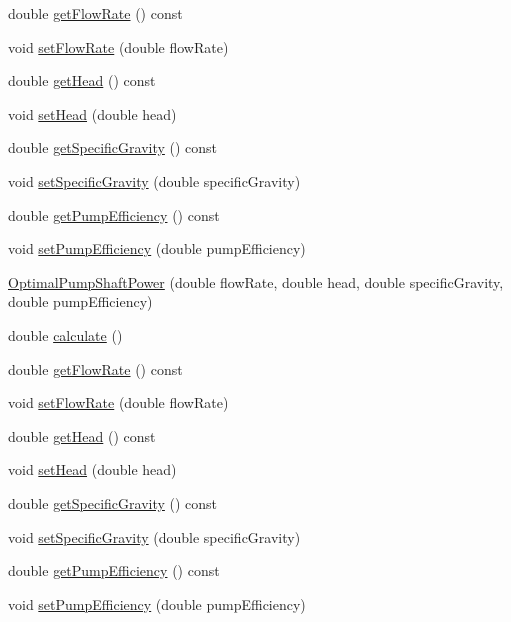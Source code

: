\begin{DoxyCompactItemize}
\item 
double \hyperlink{class_optimal_pump_shaft_power_a8c1532459a196347f7d5219d4690a490}{get\+Flow\+Rate} () const
\item 
void \hyperlink{class_optimal_pump_shaft_power_a38efdee39db4c3856915f1ab26d44ed2}{set\+Flow\+Rate} (double flow\+Rate)
\item 
double \hyperlink{class_optimal_pump_shaft_power_abb285a8a256c10187113c34db1a4462b}{get\+Head} () const
\item 
void \hyperlink{class_optimal_pump_shaft_power_aa080c62ff92fc70a4e27e7710e490b62}{set\+Head} (double head)
\item 
double \hyperlink{class_optimal_pump_shaft_power_a607d32c56edece639e03007adc1bf325}{get\+Specific\+Gravity} () const
\item 
void \hyperlink{class_optimal_pump_shaft_power_aa565a332e4b144c8eb85fd06c541199e}{set\+Specific\+Gravity} (double specific\+Gravity)
\item 
double \hyperlink{class_optimal_pump_shaft_power_a77b9c639438f9d6008c20948f173a2c4}{get\+Pump\+Efficiency} () const
\item 
void \hyperlink{class_optimal_pump_shaft_power_a2cb2c6b537c7db0bc5071f09c66308d0}{set\+Pump\+Efficiency} (double pump\+Efficiency)
\item 
\hyperlink{class_optimal_pump_shaft_power_a6970e2672e4ef7c124a876eda96ee3cc}{Optimal\+Pump\+Shaft\+Power} (double flow\+Rate, double head, double specific\+Gravity, double pump\+Efficiency)
\item 
double \hyperlink{class_optimal_pump_shaft_power_a23ab040eea0a9e0431988bd353076237}{calculate} ()
\item 
double \hyperlink{class_optimal_pump_shaft_power_a8c1532459a196347f7d5219d4690a490}{get\+Flow\+Rate} () const
\item 
void \hyperlink{class_optimal_pump_shaft_power_a38efdee39db4c3856915f1ab26d44ed2}{set\+Flow\+Rate} (double flow\+Rate)
\item 
double \hyperlink{class_optimal_pump_shaft_power_abb285a8a256c10187113c34db1a4462b}{get\+Head} () const
\item 
void \hyperlink{class_optimal_pump_shaft_power_aa080c62ff92fc70a4e27e7710e490b62}{set\+Head} (double head)
\item 
double \hyperlink{class_optimal_pump_shaft_power_a607d32c56edece639e03007adc1bf325}{get\+Specific\+Gravity} () const
\item 
void \hyperlink{class_optimal_pump_shaft_power_aa565a332e4b144c8eb85fd06c541199e}{set\+Specific\+Gravity} (double specific\+Gravity)
\item 
double \hyperlink{class_optimal_pump_shaft_power_a77b9c639438f9d6008c20948f173a2c4}{get\+Pump\+Efficiency} () const
\item 
void \hyperlink{class_optimal_pump_shaft_power_a2cb2c6b537c7db0bc5071f09c66308d0}{set\+Pump\+Efficiency} (double pump\+Efficiency)
\end{DoxyCompactItemize}


